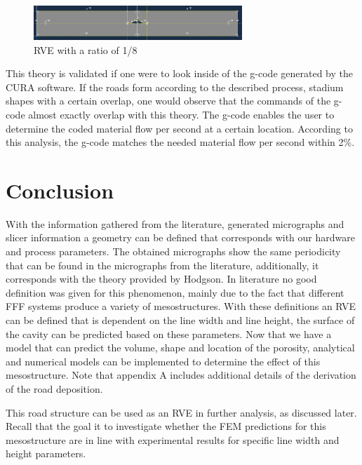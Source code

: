 \begin{figure}[htb]
    \centering
    \includegraphics[width=0.7\textwidth]{chapter_4_RVE_Definition/figures/RVER8.png}
    \caption{RVE with a ratio of 1/8}
    \label{fig:RVE1/8}
\end{figure}

This theory is validated if one were to look inside of the g-code generated by the CURA software. If the roads form according to the described process, stadium shapes with a certain overlap, one would observe that the commands of the g-code almost exactly overlap with this theory. The g-code enables the user to determine the coded material flow per second at a certain location. According to this analysis, the g-code matches the needed material flow per second within 2\%.


\section{Conclusion}
With the information gathered from the literature, generated micrographs and slicer information a geometry can be defined that corresponds with our hardware and process parameters. The obtained micrographs show the same periodicity that can be found in the micrographs from the literature, additionally, it corresponds with the theory provided by Hodgson. In literature no good definition was given for this phenomenon, mainly due to the fact that different FFF systems produce a variety of mesostructures. 
With these definitions an RVE can be defined that is dependent on the line width and line height, the surface of the cavity can be predicted based on these parameters. Now that we have a model that can predict the volume, shape and location of the porosity, analytical and numerical models can be implemented to determine the effect of this mesostructure. Note that appendix A includes additional details of the derivation of the road deposition.
 
This road structure can be used as an RVE in further analysis, as discussed later. Recall that the goal it to investigate whether the FEM predictions for this mesostructure are in line with experimental results for specific line width and height parameters.


